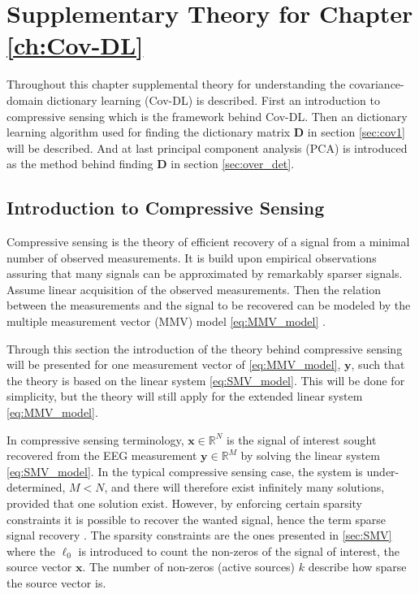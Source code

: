 \chapter{Supplementary Theory for Chapter \ref{ch:Cov-DL}}\label{app:Cov-DL}
Throughout this chapter supplemental theory for understanding the covariance-domain dictionary learning (Cov-DL) is described. First an introduction to compressive sensing which is the framework behind Cov-DL. Then an dictionary learning algorithm used for finding the dictionary matrix $\mathbf{D}$ in section \ref{sec:cov1} will be described. And at last principal component analysis (PCA) is introduced as the method behind finding $\mathbf{D}$ in section \ref{sec:over_det}.

\section{Introduction to Compressive Sensing}\label{app_sec:CS}
Compressive sensing is the theory of efficient recovery of a signal from a minimal number of observed measurements. 
It is build upon empirical observations assuring that many signals can be approximated by remarkably sparser signals. 
Assume linear acquisition of the observed measurements. 
Then the relation between the measurements and the signal to be recovered can be modeled by the multiple measurement vector (MMV) model \eqref{eq:MMV_model} \cite{FR}. 

Through this section the introduction of the theory behind compressive sensing will be presented for one measurement vector of \eqref{eq:MMV_model}, $\mathbf{y}$, such that the theory is based on the linear system \eqref{eq:SMV_model}. This will be done for simplicity, but the theory will still apply for the extended linear system \eqref{eq:MMV_model}.

In compressive sensing terminology, $\mathbf{x} \in \mathbb{R}^N$ is the signal of interest sought recovered from the EEG measurement $\mathbf{y} \in \mathbb{R}^M$ by solving the linear system \eqref{eq:SMV_model}. 
In the typical compressive sensing case, the system is under-determined, $M < N$, and there will therefore exist infinitely many solutions, provided that one solution exist.
However, by enforcing certain sparsity constraints it is possible to recover the wanted signal, hence the term sparse signal recovery \cite{FR}. 
The sparsity constraints are the ones presented in \ref{sec:SMV} where the $\ell_0$ is introduced to count the non-zeros of the signal of interest, the source vector $\mathbf{x}$. 
The number of non-zeros (active sources) $k$ describe how sparse the source vector is.
 
